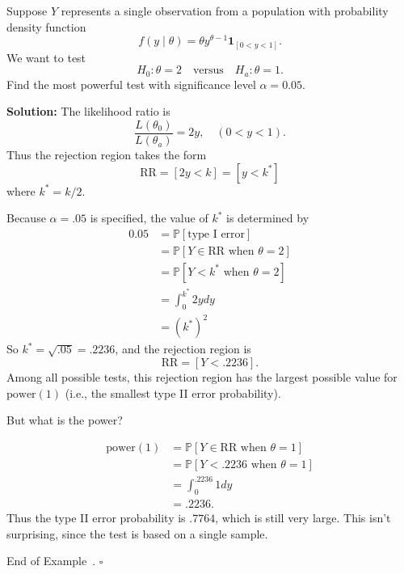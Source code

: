 \documentclass[10pt]{article}
\theoremstyle{definition}
\newtheorem{example}[theorem]{Example}
\renewenvironment{example}
{\begin{oldexample}}
  {\par\smallskip\hfill   End of Example~\theexample. $\square$    \par\end{oldexample}}
\newcommand{\vt}{\vskip 5mm} %
\newcommand{\Fl}{\vt\noindent\textbf} %
\newcommand{\1}[1]{\textbf{1}_{\left[#1\right]}} %
\def\P{\mathbb{P}} %
\begin{document}
\begin{example}
  Suppose $Y$ represents a single observation from a population with
  probability density function
  \begin{equation*}
    f(y\mid \theta) = \theta y^{\theta-1}\mathbf{1}_{\left[ 0<y<1 \right]}.
  \end{equation*}
  We want to test
  \begin{equation*}
    H_{0}:\theta=2 \quad \text{versus} \quad H_{a}:\theta=1.
  \end{equation*}
  Find the most powerful test with significance level $\alpha=0.05$.

  \Fl{Solution:} The likelihood ratio is
  \begin{equation*}
    \frac{L(\theta_{0})}{L(\theta_{a})} = 2y,\quad (0<y<1).
  \end{equation*}
  Thus the rejection region takes the form
  \begin{equation*}
    \text{RR} = \left[ 2y<k \right] = \left[ y<k^{*} \right] 
  \end{equation*}
  where $k^{*}=k/2$.

  Because $\alpha=.05$ is specified, the value of $k^{*}$ is determined by
  \begin{align*}
    0.05
    &= \P\left[\text{type I error} \right]\\
    &= \P\left[Y\in \text{RR} \text{ when }\theta=2 \right]\\
    &= \P\left[Y<k^{*} \text{ when }\theta=2 \right]\\
    &= \int_{0}^{k^{*}}2ydy\\ 
    &= (k^{*})^{2}
  \end{align*}
  So $k^{*} = \sqrt{.05}=.2236$, and the rejection region is
  \begin{equation*}
    \text{RR} = \left[ Y< .2236 \right] .
  \end{equation*}
  Among all possible tests, this rejection region has the largest possible
  value for $\text{power}(1)$ (i.e., the smallest type II error probability).


  But what is the power?

  \begin{align*}
    \text{power}(1)
    &=\P\left[Y\in \text{RR} \text{ when }\theta=1 \right]\\
    &= \P\left[Y<.2236 \text{ when }\theta=1 \right]\\
    &= \int_{0}^{.2236} 1 dy\\
    &= .2236.
  \end{align*}
  Thus the type II error probability is $.7764$, which is still very large.
  This isn't surprising, since the test is based on a single sample.
\end{example}
\end{document}
